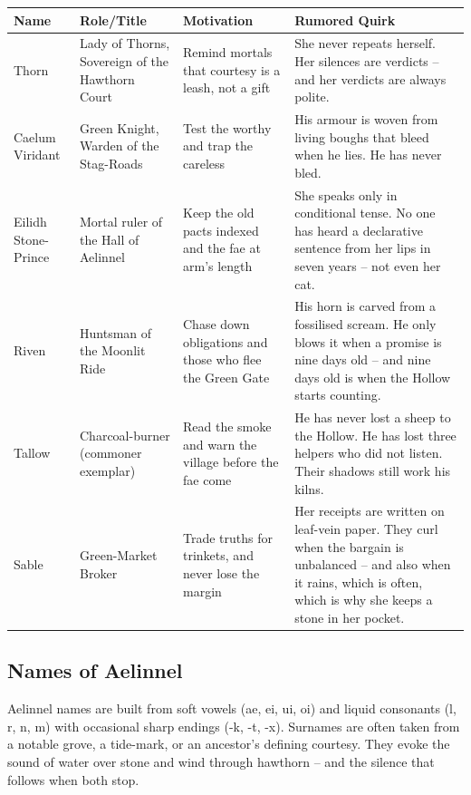 \begin{longtable}{|p{}|p{}|p{}|p{}|}
\hline
\textbf{Name} & \textbf{Role/Title} & \textbf{Motivation} & \textbf{Rumored Quirk} \\
\hline
Thorn & Lady of Thorns, Sovereign of the Hawthorn Court & Remind mortals that courtesy is a leash, not a gift & She never repeats herself. Her silences are verdicts -- and her verdicts are always polite. \\
\hline
Caelum Viridant & Green Knight, Warden of the Stag-Roads & Test the worthy and trap the careless & His armour is woven from living boughs that bleed when he lies. He has never bled. \\
\hline
Eilidh Stone-Prince & Mortal ruler of the Hall of Aelinnel & Keep the old pacts indexed and the fae at arm's length & She speaks only in conditional tense. No one has heard a declarative sentence from her lips in seven years -- not even her cat. \\
\hline
Riven & Huntsman of the Moonlit Ride & Chase down obligations and those who flee the Green Gate & His horn is carved from a fossilised scream. He only blows it when a promise is nine days old -- and nine days old is when the Hollow starts counting. \\
\hline
Tallow & Charcoal-burner (commoner exemplar) & Read the smoke and warn the village before the fae come & He has never lost a sheep to the Hollow. He has lost three helpers who did not listen. Their shadows still work his kilns. \\
\hline
Sable & Green-Market Broker & Trade truths for trinkets, and never lose the margin & Her receipts are written on leaf-vein paper. They curl when the bargain is unbalanced -- and also when it rains, which is often, which is why she keeps a stone in her pocket. \\
\hline
\end{longtable}

\subsection*{Names of Aelinnel}
\label{sec:aelinnel-names}

Aelinnel names are built from soft vowels (ae, ei, ui, oi) and liquid consonants (l, r, n, m) with occasional sharp endings (-k, -t, -x). Surnames are often taken from a notable grove, a tide-mark, or an ancestor's defining courtesy. They evoke the sound of water over stone and wind through hawthorn -- and the silence that follows when both stop.

